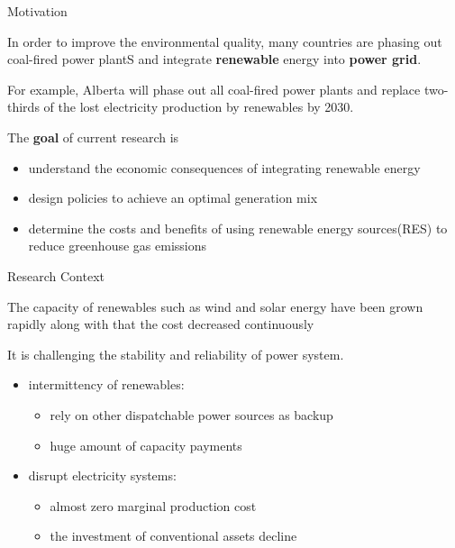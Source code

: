 \documentclass[newPxFont,numfooter,progressbar,sectionpages]{beamer}
\begin{document}
\begin{frame}[c]{Motivation}

In order to improve the environmental quality, many countries are phasing out coal-fired power plantS and integrate \textbf{renewable} energy into \textbf{power grid}.  

For example, Alberta will phase out all coal-fired power plants and replace two-thirds of the lost electricity production by renewables by 2030.


The \textbf{goal} of current research is 

\begin{itemize}
	\item understand the economic consequences of integrating renewable energy
	\item design policies to achieve an optimal generation mix
	\item determine the costs and benefits of using renewable energy sources(RES) to reduce greenhouse gas emissions
\end{itemize}


\end{frame}



\begin{frame}[c]{Research Context}
	
The capacity of renewables such as wind and solar energy have been grown rapidly along with that the cost decreased continuously   

It is challenging the stability and reliability of power system.
\begin{itemize}
	
	\item intermittency of renewables:
	 	
	\begin{itemize}
		\item rely on other dispatchable power sources as backup
		\item huge amount of capacity payments
	\end{itemize}

	\item disrupt electricity systems: 
		\begin{itemize}
		\item almost zero marginal production cost
		\item the investment of conventional assets decline
		\end{itemize}	
	

\end{itemize} 


\end{frame}
\end{document}
